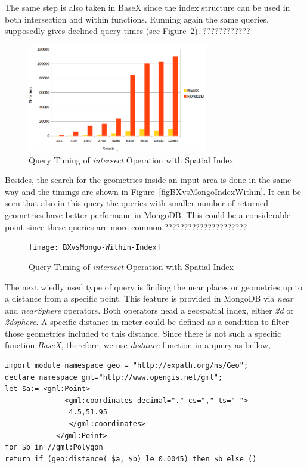 \documentclass[a4paper,12pt]{article}
\begin{document}
The same step is also taken in BaseX since the index structure can be used in both intersection and within functions. Running again the same queries, supposedly gives declined query times (see Figure~\ref{figBXvsMongoIndexIntersects}). ????????????


\begin{figure}
\centering
\includegraphics[width=0.7\textwidth]{BXvsMongo-Intersects-Index}
\caption{Query Timing of \textit{intersect} Operation with Spatial Index}
\label{figBXvsMongoIndexIntersects}
\end{figure}

Besides, the search for the geometries inside an input area is done in the same way and the timings are shown in Figure~\ref{figBXvsMongoIndexWithin}. It can be seen that also in this query the queries with smaller number of returned geometries have better performane in MongoDB. This could be a considerable point since these queries are more common.?????????????????????

\begin{figure}
\centering
\texttt{[image: BXvsMongo-Within-Index]}
\caption{Query Timing of \textit{intersect} Operation with Spatial Index}
\label{figBXvsMongoIndexIntersects}
\end{figure}

The next wiedly used type of query is finding the near places or geometries up to a distance from a specific point. This feature is provided in MongoDB via \textit{near} and \textit{nearSphere} operators. Both operators nead a geospatial index, either \textit{2d} or \textit{2dsphere}. A specific distance in meter could be defined as a condition to filter those geometries included to this distance. Since there is not such a specific function \textit{BaseX}, therefore, we use \textit{distance} function in a query as bellow,

\begin{verbatim}
import module namespace geo = "http://expath.org/ns/Geo";
declare namespace gml="http://www.opengis.net/gml";
let $a:= <gml:Point>
              <gml:coordinates decimal="." cs="," ts=" ">
               4.5,51.95 
               </gml:coordinates>
            </gml:Point>
for $b in //gml:Polygon 
return if (geo:distance( $a, $b) le 0.0045) then $b else ()
\end{verbatim}
\end{document}
